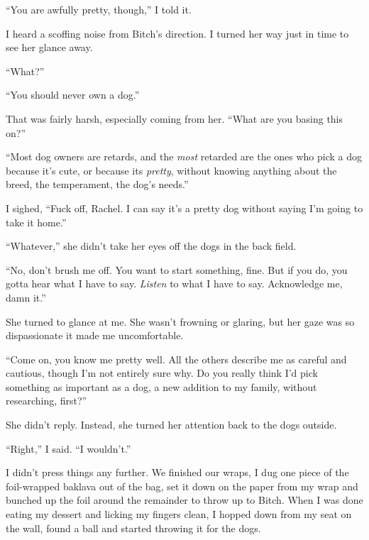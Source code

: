 ``You are awfully pretty, though,'' I told it.



I heard a scoffing noise from Bitch's direction.  I turned her way just in time to see her glance away.



``What?''



``You should never own a dog.''



That was fairly harsh, especially coming from her.  ``What are you basing this on?''



``Most dog owners are retards, and the \emph{most} retarded are the ones who pick a dog because it's cute, or because its \emph{pretty}, without knowing anything about the breed, the temperament, the dog's needs.''



I sighed, ``Fuck off, Rachel.  I can say it's a pretty dog without saying I'm going to take it home.''



``Whatever,'' she didn't take her eyes off the dogs in the back field.



``No, don't brush me off.  You want to start something, fine.  But if you do, you gotta hear what I have to say.  \emph{Listen} to what I have to say.  Acknowledge me, damn it.''



She turned to glance at me.  She wasn't frowning or glaring, but her gaze was so dispassionate it made me uncomfortable.



``Come on, you know me pretty well.  All the others describe me as careful and cautious, though I'm not entirely sure why.  Do you really think I'd pick something as important as a dog, a new addition to my family, without researching, first?''



She didn't reply.  Instead, she turned her attention back to the dogs outside.



``Right,'' I said.  ``I wouldn't.''



I didn't press things any further.  We finished our wraps, I dug one piece of the foil-wrapped baklava out of the bag, set it down on the paper from my wrap and bunched up the foil around the remainder to throw up to Bitch.  When I was done eating my dessert and licking my fingers clean, I hopped down from my seat on the wall, found a ball and started throwing it for the dogs.



